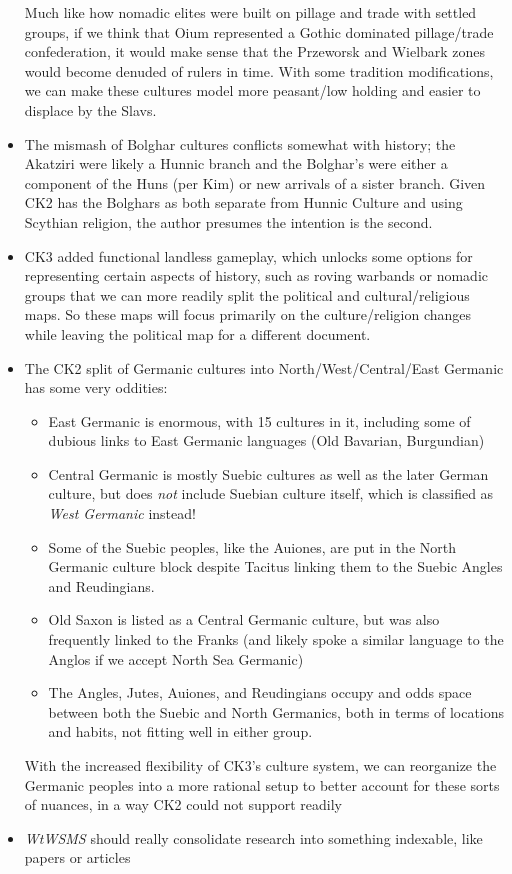 \documentclass{article}
\begin{document}
\begin{itemize}
		Much like how nomadic elites were built on pillage and trade with settled groups, if we think that Oium represented a Gothic dominated pillage/trade confederation, it would make sense that the Przeworsk and Wielbark zones would become denuded of rulers in time.
		With some tradition modifications, we can make these cultures model more peasant/low holding and easier to displace by the Slavs.
		\item The mismash of Bolghar cultures conflicts somewhat with history; the Akatziri were likely a Hunnic branch \cite{KimHuns,OttoHuns} and the Bolghar's were either a component of the Huns (per Kim) or new arrivals of a sister branch.
		Given CK2 has the Bolghars as both separate from Hunnic Culture and using Scythian religion, the author presumes the intention is the second.
		\item CK3 added functional landless gameplay, which unlocks some options for representing certain aspects of history, such as roving warbands or nomadic groups that we can more readily split the political and cultural/religious maps.
		So these maps will focus primarily on the culture/religion changes while leaving the political map for a different document.
		\item The CK2 split of Germanic cultures into North/West/Central/East Germanic has some very oddities:
		\begin{itemize}
			\item East Germanic is enormous, with 15 cultures in it, including some of dubious links to East Germanic languages (Old Bavarian, Burgundian)
			\item Central Germanic is mostly Suebic cultures as well as the later German culture, but does \textit{not} include Suebian culture itself, which is classified as \textit{West Germanic} instead!
			\item Some of the Suebic peoples, like the Auiones, are put in the North Germanic culture block despite Tacitus linking them to the Suebic Angles and Reudingians.
			\item Old Saxon is listed as a Central Germanic culture, but was also frequently linked to the Franks (and likely spoke a similar language to the Anglos if we accept North Sea Germanic)
			\item The Angles, Jutes, Auiones, and Reudingians occupy and odds space between both the Suebic and North Germanics, both in terms of locations and habits, not fitting well in either group.
		\end{itemize}
		With the increased flexibility of CK3's culture system, we can reorganize the Germanic peoples into a more rational setup to better account for these sorts of nuances, in a way CK2 could not support readily
		\item \textit{WtWSMS} should really consolidate research into something indexable, like papers or articles
	\end{itemize}
	
\end{document}
